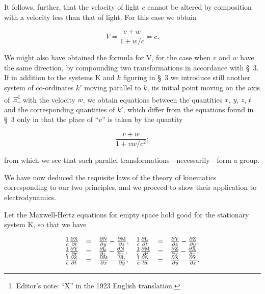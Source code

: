 \documentclass{article}
\newcommand{\dd}[2]{\frac{\partial #1}{\partial #2}}
\newcounter{fnsave}
\newcommand{\edNoteBegin}{
\renewcommand{\thefootnote}{\fnsymbol{footnote}}
\setcounter{fnsave}{\value{footnote}}
\setcounter{footnote}{1}
}
\newcommand{\edNoteEnd}{
\renewcommand{\thefootnote}{\arabic{footnote}}
\setcounter{footnote}{\value{fnsave}}
}
\begin{document}
It follows, further, that the velocity of light $c$ cannot be altered by
composition with a velocity less than that of light.  For this case we
obtain

\[
V=\frac{c+w}{1+w/c}=c.
\]

\edNoteBegin
\noindent
We might also have obtained the formula for V, for the case when $v$
and $w$ have the same direction, by compounding two transformations in
accordance with \S\ 3.  If in addition to the systems K and $k$ figuring
in \S\ 3 we introduce still another system of co-ordinates $k'$ moving
parallel to $k$, its initial point moving on the axis of $\Xi$\footnote{
    {\sf Editor's note: ``{\rm X}'' in the 1923 English translation.}
}
with the
velocity $w$, we obtain equations between the quantities $x$, $y$,
$z$, $t$ and the corresponding quantities of $k'$, which differ from
the equations found in \S\ 3 only in that the place of ``$v$'' is taken by
the quantity
\edNoteEnd

\[
\frac{v+w}{1+vw/c^2};
\]

\noindent
from which we see that such parallel transformations---necessarily---form
a group.

We have now deduced the requisite laws of the theory of kinematics
corresponding to our two principles, and we proceed to show their
application to electrodynamics.


Let the Maxwell-Hertz equations for empty space hold good for the
stationary system K, so that we have

\renewcommand{\arraystretch}{1.5}
{\Large
\[
\begin{array}{llllll}
\frac{1}{c}\dd{\rm X}{t} & = & \dd{\rm N}{y} - \dd{\rm M}{z}, &
    \frac{1}{c}\dd{\rm L}{t} & = & \dd{\rm Y}{z}-\dd{\rm Z}{y}, \\
\frac{1}{c}\dd{\rm Y}{t} & = & \dd{\rm L}{z} - \dd{\rm N}{x}, &
    \frac{1}{c}\dd{\rm M}{t} & = & \dd{\rm Z}{x}-\dd{\rm X}{z}, \\
\frac{1}{c}\dd{\rm Z}{t} & = & \dd{\rm M}{x} - \dd{\rm L}{y}, &
    \frac{1}{c}\dd{\rm N}{t} & = & \dd{\rm X}{y}-\dd{\rm Y}{x}, \\
\end{array}
\]
}
\renewcommand{\arraystretch}{1}
\end{document}
